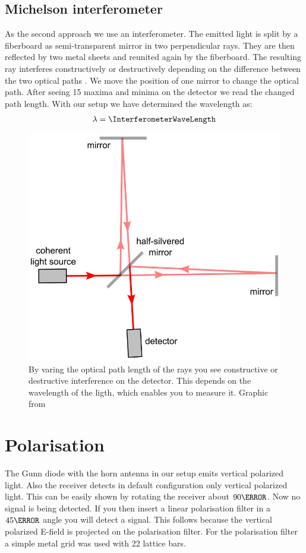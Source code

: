 \documentclass[a4paper,10pt,twocolumn]{article}
\begin{document}
    \subsection{Michelson interferometer}
    As the second approach we use an interferometer.
    The emitted light is split by a fiberboard as semi-transparent mirror in two perpendicular rays.
    They are then reflected by two metal sheets and reunited again by the fiberboard. 
    The resulting ray interferes constructively or destructively depending on the difference between the two optical paths .
    We move the position of one mirror to change the optical path.
    After seeing 15 maxima and minima on the detector we read the changed
    path length.
    With our setup we have determined the wavelength as:
    \begin{align*}
        \lambda = \InterferometerWaveLength
    \end{align*}
    \begin{figure}[htbp]
        \includegraphics[width=0.9\linewidth]{Interferometer}
        \center
        \caption{By varing the optical path length of the rays you see constructive or destructive interference on the
        detector. This depends on the wavelength of the ligth, which enables you to measure it.
        Graphic from~\cite{imageMichelsonInterferometerWiki}}
        \label{fig:Interferometer}
    \end{figure}
    \section{Polarisation}
    The Gunn diode with the horn antenna in our setup emits vertical polarized light.
    Also the receiver detects in default configuration only vertical polarized light.
    This can be easily shown by rotating the receiver about $ 90\degree$.
    Now no signal is being detected.
    If you then insert a linear polarisation filter in a $ 45\degree$ angle you will detect a signal.
    This follows because the vertical polarized E-field is projected on the polarisation filter.
    For the polarisation filter a simple metal grid was used with 22 lattice bars.
\end{document}
